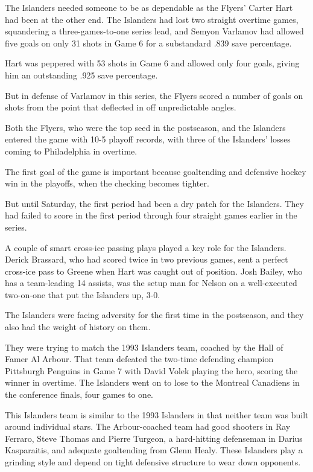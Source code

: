 The Islanders needed someone to be as dependable as the Flyers' Carter
Hart had been at the other end. The Islanders had lost two straight
overtime games, squandering a three-games-to-one series lead, and Semyon
Varlamov had allowed five goals on only 31 shots in Game 6 for a
substandard .839 save percentage.

Hart was peppered with 53 shots in Game 6 and allowed only four goals,
giving him an outstanding .925 save percentage.

But in defense of Varlamov in this series, the Flyers scored a number of
goals on shots from the point that deflected in off unpredictable
angles.

Both the Flyers, who were the top seed in the postseason, and the
Islanders entered the game with 10-5 playoff records, with three of the
Islanders' losses coming to Philadelphia in overtime.

The first goal of the game is important because goaltending and
defensive hockey win in the playoffs, when the checking becomes tighter.

But until Saturday, the first period had been a dry patch for the
Islanders. They had failed to score in the first period through four
straight games earlier in the series.

A couple of smart cross-ice passing plays played a key role for the
Islanders. Derick Brassard, who had scored twice in two previous games,
sent a perfect cross-ice pass to Greene when Hart was caught out of
position. Josh Bailey, who has a team-leading 14 assists, was the setup
man for Nelson on a well-executed two-on-one that put the Islanders up,
3-0.

The Islanders were facing adversity for the first time in the
postseason, and they also had the weight of history on them.

They were trying to match the 1993 Islanders team, coached by the Hall
of Famer Al Arbour. That team defeated the two-time defending champion
Pittsburgh Penguins in Game 7 with David Volek playing the hero, scoring
the winner in overtime. The Islanders went on to lose to the Montreal
Canadiens in the conference finals, four games to one.

This Islanders team is similar to the 1993 Islanders in that neither
team was built around individual stars. The Arbour-coached team had good
shooters in Ray Ferraro, Steve Thomas and Pierre Turgeon, a hard-hitting
defenseman in Darius Kasparaitis, and adequate goaltending from Glenn
Healy. These Islanders play a grinding style and depend on tight
defensive structure to wear down opponents.

